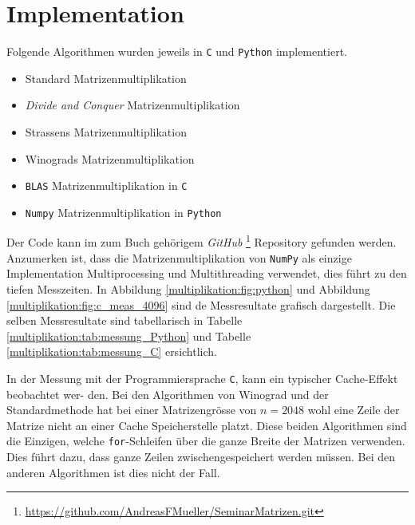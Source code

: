 


\section{Implementation}\label{multiplikation:section:Implementation}

Folgende Algorithmen wurden jeweils in \texttt{C} und \texttt{Python} implementiert.
\begin{itemize}
	\item Standard Matrizenmultiplikation
	\item \textit{Divide and Conquer} Matrizenmultiplikation
	\item Strassens Matrizenmultiplikation
	\item Winograds Matrizenmultiplikation
	\item \texttt{BLAS} Matrizenmultiplikation in \texttt{C}
	\item \texttt{Numpy} Matrizenmultiplikation in \texttt{Python}
\end{itemize}

Der Code kann im zum Buch gehörigem \textit{GitHub} \footnote{\url{https://github.com/AndreasFMueller/SeminarMatrizen.git}} Repository gefunden werden.
Anzumerken ist, dass die Matrizenmultiplikation von \texttt{NumPy} als einzige Implementation Multiprocessing und Multithreading verwendet, dies f\"uhrt zu den tiefen Messzeiten.
In Abbildung \ref{multiplikation:fig:python} und Abbildung \ref{multiplikation:fig:c_meas_4096} sind de Messresultate grafisch dargestellt. Die selben Messresultate sind tabellarisch in Tabelle \ref{multiplikation:tab:messung_Python} und Tabelle \ref{multiplikation:tab:messung_C} ersichtlich.

In der Messung mit der Programmiersprache \texttt{C}, kann ein typischer Cache-Effekt beobachtet wer-
den.
Bei den Algorithmen von Winograd und der Standardmethode hat bei einer Matrizengrösse von $n = 2048$ wohl eine Zeile der Matrize nicht an einer Cache Speicherstelle platzt.
Diese beiden Algorithmen sind die Einzigen, welche \texttt{for}-Schleifen über die ganze Breite der Matrizen verwenden.
Dies führt dazu, dass ganze Zeilen zwischengespeichert werden müssen.
Bei den anderen Algorithmen ist dies nicht der Fall.

